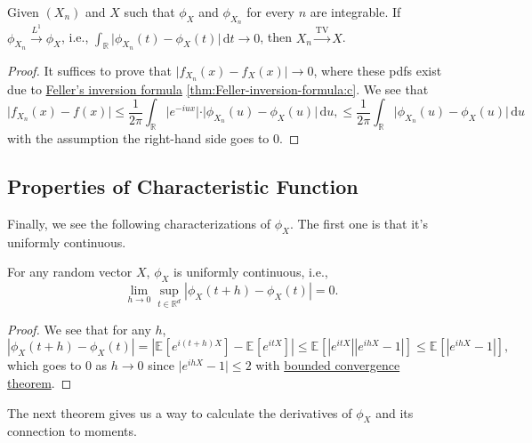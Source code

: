 \begin{corollary}
	Given \((X_n)\) and \(X\) such that \(\phi _X\) and \(\phi _{X_n}\) for every \(n\) are integrable. If \(\phi _{X_n} \overset{L^1}{\to } \phi _X\), i.e., \(\int _\mathbb{R} \vert \phi _{X_n}(t) - \phi _X (t) \vert \,\mathrm{d} t \to 0\), then \(X_n \overset{\operatorname{TV} }{\to } X\).
\end{corollary}
\begin{proof}
	It suffices to prove that \(\vert f_{X_n}(x) - f_X(x) \vert \to 0\), where these pdfs exist due to \hyperref[thm:Feller-inversion-formula]{Feller's inversion formula} \autoref{thm:Feller-inversion-formula:c}. We see that
	\[
		\vert f_{X_n}(x) - f(x) \vert
		\leq \frac{1}{2\pi } \int _{\mathbb{R} } \vert e^{-iux} \vert \cdot \vert \phi _{X_n}(u) - \phi _X(u) \vert \,\mathrm{d} u,
		\leq \frac{1}{2\pi } \int _{\mathbb{R} } \vert \phi _{X_n}(u) - \phi _X(u) \vert \,\mathrm{d} u
	\]
	with the assumption the right-hand side goes to \(0\).
\end{proof}

\subsection{Properties of Characteristic Function}
Finally, we see the following characterizations of \(\phi _X\). The first one is that it's uniformly continuous.

\begin{proposition}\label{prop:characteristic-function-uniformly-continuous}
	For any random vector \(X\), \(\phi _X\) is uniformly continuous, i.e.,
	\[
		\lim_{h \to 0} \sup _{t \in \mathbb{R} ^d} \left\vert \phi _X(t + h) - \phi _X(t) \right\vert = 0.
	\]
\end{proposition}
\begin{proof}
	We see that for any \(h\),
	\[
		\left\vert \phi _{X}(t + h) - \phi _X(t) \right\vert
		= \left\vert \mathbb{E}_{}[e^{i(t + h)X}] - \mathbb{E}_{}[e^{itX}] \right\vert
		\leq \mathbb{E}_{}\left[ \left\vert e^{itX} \right\vert \left\vert e^{ihX} - 1 \right\vert \right]
		\leq \mathbb{E}_{}\left[ \left\vert e^{ihX} - 1 \right\vert \right],
	\]
	which goes to \(0\) as \(h \to 0\) since \(\vert e^{ihX} - 1\vert \leq 2\) with \href{https://en.wikipedia.org/wiki/Dominated_convergence_theorem}{bounded convergence theorem}.
\end{proof}

The next theorem gives us a way to calculate the derivatives of \(\phi _X\) and its connection to moments.


